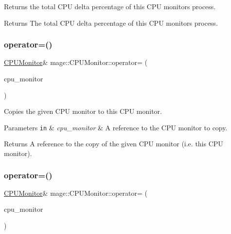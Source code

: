 Returns the total C\+PU delta percentage of this C\+PU monitor\textquotesingle{}s process.

\begin{DoxyReturn}{Returns}
The total C\+PU delta percentage of this C\+PU monitor\textquotesingle{}s process. 
\end{DoxyReturn}
\hypertarget{classmage_1_1_c_p_u_monitor_a6009df0994652d011a78d1f12013e599}{}\label{classmage_1_1_c_p_u_monitor_a6009df0994652d011a78d1f12013e599} 
\subsubsection{\texorpdfstring{operator=()}{operator=()}\hspace{0.1cm}{\footnotesize\ttfamily [1/2]}}
{\footnotesize\ttfamily \hyperlink{classmage_1_1_c_p_u_monitor}{C\+P\+U\+Monitor}\& mage\+::\+C\+P\+U\+Monitor\+::operator= (\begin{DoxyParamCaption}\item[{const \hyperlink{classmage_1_1_c_p_u_monitor}{C\+P\+U\+Monitor} \&}]{cpu\+\_\+monitor }\end{DoxyParamCaption})}

Copies the given C\+PU monitor to this C\+PU monitor.


\begin{DoxyParams}[1]{Parameters}
\mbox{\tt in}  & {\em cpu\+\_\+monitor} & A reference to the C\+PU monitor to copy. \\
\hline
\end{DoxyParams}
\begin{DoxyReturn}{Returns}
A reference to the copy of the given C\+PU monitor (i.\+e. this C\+PU monitor). 
\end{DoxyReturn}
\hypertarget{classmage_1_1_c_p_u_monitor_ad931f354e4191429937cb2c3e44290f1}{}\label{classmage_1_1_c_p_u_monitor_ad931f354e4191429937cb2c3e44290f1} 
\subsubsection{\texorpdfstring{operator=()}{operator=()}\hspace{0.1cm}{\footnotesize\ttfamily [2/2]}}
{\footnotesize\ttfamily \hyperlink{classmage_1_1_c_p_u_monitor}{C\+P\+U\+Monitor}\& mage\+::\+C\+P\+U\+Monitor\+::operator= (\begin{DoxyParamCaption}\item[{\hyperlink{classmage_1_1_c_p_u_monitor}{C\+P\+U\+Monitor} \&\&}]{cpu\+\_\+monitor }\end{DoxyParamCaption})\hspace{0.3cm}{\ttfamily [default]}}


